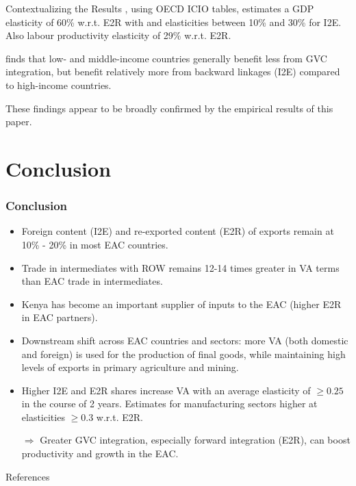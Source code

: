 \documentclass[compress]{beamer}
\newenvironment{noheadline}{
    \setbeamertemplate{headline}{}
    \addtobeamertemplate{frametitle}{\vspace*{-0.9\baselineskip}}{}
}{}
\begin{document}
\begin{frame}{Contextualizing the Results}
\citet{Kummritz20161}, using OECD ICIO tables, estimates a GDP elasticity of 60\% w.r.t. E2R with and elasticities between 10\% and 30\% for I2E. Also labour productivity elasticity of 29\% w.r.t. E2R. \newline 


\citet{kummritz2015global} finds that low- and middle-income countries generally benefit less from GVC integration, but benefit relatively more from backward linkages (I2E) compared to high-income countries. \newline

These findings appear to be broadly confirmed by the empirical results of this paper.
\end{frame}

\section{Conclusion}

\begin{noheadline}
\begin{frame}
\frametitle{Conclusion}
\begin{itemize} \setlength{\itemsep}{0.5em}
\item Foreign content (I2E) and re-exported content (E2R) of exports remain at 10\% - 20\% in most EAC countries. 

\item Trade in intermediates with ROW remains 12-14 times greater in VA terms than EAC trade in intermediates. 

\item Kenya has become an important supplier of inputs to the EAC (higher E2R in EAC partners). 

\item Downstream shift across EAC countries and sectors: more VA (both domestic and foreign) is used for the production of final goods, while maintaining high levels of exports in primary agriculture and mining.

\item Higher I2E and E2R shares increase VA with an average elasticity of $\geq 0.25$ in the course of 2 years. Estimates for manufacturing sectors higher at elasticities $\geq 0.3$ w.r.t. E2R. 
\item[$\Rightarrow$] Greater GVC integration, especially forward integration (E2R), can boost productivity and growth in the EAC.
\end{itemize}
\end{frame}

\begin{frame}{References}
\tiny


\end{frame}
\end{noheadline}
\end{document}
